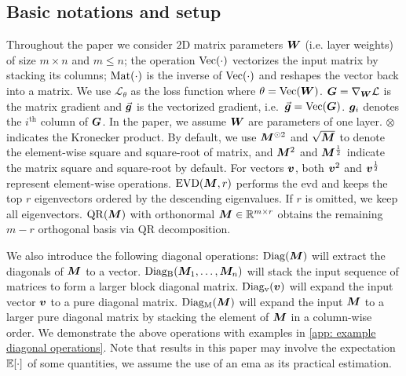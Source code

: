 \subsection{Basic notations and setup}
\label{subsec: notations and setups}
Throughout the paper we consider  $2$D matrix parameters ${\bm{W}}$ (i.e. layer weights) of size $m\times n$ and $m\leq n$; the operation $\operatorname{Vec}(\cdot)$ vectorizes the input matrix by stacking its columns; $\operatorname{Mat}(\cdot)$ is the inverse of $\operatorname{Vec}(\cdot)$ and reshapes the vector back into a matrix. We use $\mathcal{L}_\theta$ as the loss function where $\theta = \operatorname{Vec}({\bm{W}})$. 
${\bm{G}}=\nabla_{{\bm{W}}}\mathcal{L}$ is the matrix gradient and $\vec{\bm{g}}$ is the vectorized gradient, i.e.~$\vec{\bm{g}} = \operatorname{Vec}({\bm{G}})$. ${\bm{g}}_i$ denotes the $i^{\text{th}}$ column of ${\bm{G}}$. In the paper, we assume ${\bm{W}}$ are parameters of one layer. $\otimes$ indicates the Kronecker product. By default, we use ${\bm{M}}^{\odot 2}$ and $\sqrt{{\bm{M}}}$ to denote the element-wise square and square-root of matrix, and ${\bm{M}}^2$ and ${\bm{M}}^{\frac{1}{2}}$ indicate the matrix square and square-root by default. For vectors ${\bm{v}}$, both ${\bm{v}}^{2}$ and ${\bm{v}}^{\frac{1}{2}}$ represent element-wise operations. 
$\operatorname{EVD}({\bm{M}},r)$ performs the \gls{evd} and keeps the top $r$ eigenvectors ordered by the descending eigenvalues. If $r$ is omitted, we keep all eigenvectors. $\operatorname{QR}({\bm{M}})$ with orthonormal ${\bm{M}}\in\mathbb{R}^{m\times r}$ obtains the remaining $m-r$ orthogonal basis via QR decomposition.

We also introduce the following diagonal operations:
$\operatorname{Diag}({\bm{M}})$ will extract the diagonals of ${\bm{M}}$ to a vector. $\operatorname{Diag_B}({\bm{M}}_1,\ldots,{\bm{M}}_n)$ will stack the input sequence of matrices to form a larger block diagonal matrix. $\operatorname{Diag_v}({\bm{v}})$ will expand the input vector ${\bm{v}}$ to a pure diagonal matrix. $\operatorname{Diag_M}({\bm{M}})$ will expand the input ${\bm{M}}$ to a larger pure diagonal matrix by stacking the element of ${\bm{M}}$ in a column-wise order. We demonstrate the above operations with examples in \cref{app: example diagonal operations}.
Note that results in this paper may involve the expectation $\mathbb{E}[\cdot]$ of some quantities, we assume the use of an \gls{ema} as its practical estimation. 
